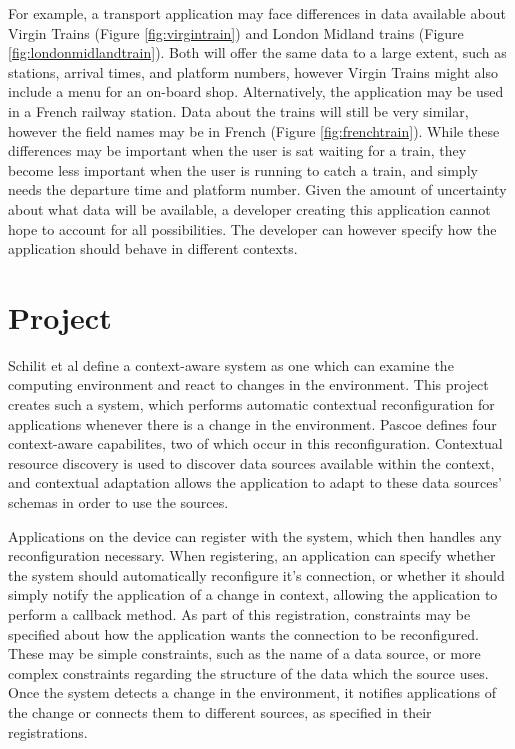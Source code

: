 \documentclass[12pt,twoside,notitlepage]{report}
\begin{document}
For example, a transport application may face differences in data available about Virgin Trains (Figure \ref{fig:virgintrain}) and London Midland trains (Figure \ref{fig:londonmidlandtrain}). 
Both will offer the same data to a large extent, such as stations, arrival times, and platform numbers, however Virgin Trains might also include a menu for an on-board shop. 
Alternatively, the application may be used in a French railway station. 
Data about the trains will still be very similar, however the field names may be in French (Figure \ref{fig:frenchtrain}). 
While these differences may be important when the user is sat waiting for a train, they become less important when the user is running to catch a train, and simply needs the departure time and platform number.
Given the amount of uncertainty about what data will be available, a developer creating this application cannot hope to account for all possibilities. The developer can however specify how the application should behave in different contexts.

\section{Project}

Schilit et al \cite{Schilit:1994:CCA:1439278.1440041}  define a context-aware system as one which can examine the computing environment and react to changes in the environment. 
This project creates such a system, which performs automatic contextual reconfiguration for applications whenever there is a change in the environment. 
Pascoe \cite{Pascoe:1998:AGC:857199.858020} defines four context-aware capabilites, two of which occur in this reconfiguration. 
Contextual resource discovery is used to discover data sources available within the context, and contextual adaptation allows the application to adapt to these data sources' schemas in order to use the sources.

Applications on the device can register with the system, which then handles any reconfiguration necessary.
When registering, an application can specify whether the system should automatically reconfigure it's connection, or whether it should simply notify the application of a change in context, allowing the application to perform a callback method.
As part of this registration, constraints may be specified about how the application wants the connection to be reconfigured. 
These may be simple constraints, such as the name of a data source, or more complex constraints regarding the structure of the data which the source uses. 
Once the system detects a change in the environment, it notifies applications of the change or connects them to different sources, as specified in their registrations.
\end{document}
